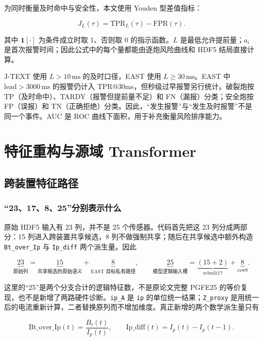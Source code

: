 \documentclass[11pt,a4paper]{article}
\newcommand{\code}[1]{\texttt{\small #1}}
\begin{document}
为同时衡量及时命中与安全性，本文使用 Youden 型差值指标：

\begin{equation}
J_L(\tau)=\mathrm{TPR}_{L}(\tau)-\mathrm{FPR}(\tau).
\label{eq:j-score}
\end{equation}

其中 \(\mathbf{1}[\cdot]\) 为条件成立时取 1、否则取 0 的指示函数。\(L\) 是最低允许提前量；\(a_i\) 是首次报警时间；因此公式中的每个量都能由逐炮风险曲线和 HDF5 结局直接计算。

J-TEXT 使用 \(L>10\,\mathrm{ms}\) 的及时口径，EAST 使用 \(L\geq30\,\mathrm{ms}\)。EAST 中 \(\mathrm{lead}>3000\,\mathrm{ms}\) 的报警仍计入 TPR@30ms，但秒级过早报警另行统计。破裂炮按 TP（及时命中）、TARDY（报警但提前量不足）和 FN（漏报）分类；安全炮按 FP（误报）和 TN（正确拒绝）分类。因此，“发生报警”与“发生及时报警”不是同一个事件。AUC 是 ROC 曲线下面积，用于补充衡量风险排序能力。

\section{特征重构与源域 Transformer}

\subsection{跨装置特征路径}

\subsubsection{“23、17、8、25”分别表示什么}

原始 HDF5 输入有 23 列，并不是 25 个传感器。代码首先把这 23 列分成两部分：15 列进入跨装置共享候选，8 列不做强制共享；随后在共享候选中额外构造 \code{Bt\_over\_Ip} 与 \code{Ip\_diff} 两个派生量。因此

\[
\underbrace{23}_{\text{原始列}}
=\underbrace{15}_{\text{共享候选的原始语义}}
+\underbrace{8}_{\text{EAST 目标私有路径}},
\qquad
\underbrace{25}_{\text{模型逻辑输入槽}}
=\underbrace{(15+2)}_{\text{rebuilt17}}
+\underbrace{8}_{\text{raw8}}.
\]

这里的“25”是两个分支合计的逻辑特征数，不是原论文完整 PGFE25 的等价复现，也不是新增了两路硬件诊断。\code{ip\_A} 是 \code{ip} 的单位统一结果；\code{Z\_proxy} 是用统一后的电流重新计算，二者替换原列而不增加维度。真正新增的两个数学派生量只有

\[
\mathrm{Bt\_over\_Ip}(t)=\frac{B_t(t)}{I_p(t)},
\qquad
\mathrm{Ip\_diff}(t)=I_p(t)-I_p(t-1).
\]
\end{document}
